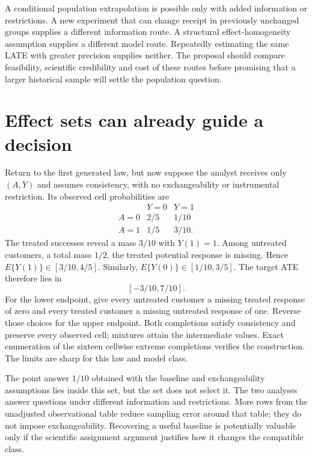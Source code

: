 A conditional population extrapolation is possible only with
added information or restrictions. A new experiment that can
change receipt in previously unchanged groups supplies a
different information route. A structural effect-homogeneity
assumption supplies a different model route. Repeatedly
estimating the same LATE with greater precision supplies
neither. The proposal should compare feasibility, scientific
credibility and cost of these routes before promising that a
larger historical sample will settle the population question.

\section{Effect sets can already guide a decision}
\label{exec17:s3-bounds}

Return to the first generated law, but now suppose the analyst
receives only $(A,Y)$ and assumes consistency, with no
exchangeability or instrumental restriction. Its observed
cell probabilities are
\[
\begin{array}{c|cc}
 &Y=0&Y=1\\ \hline
 A=0&2/5&1/10\\
 A=1&1/5&3/10 .
\end{array}
\]
The treated successes reveal a mass $3/10$ with $Y(1)=1$.
Among untreated customers, a total mass $1/2$, the treated
potential response is missing. Hence
$E\{Y(1)\}\in[3/10,4/5]$. Similarly,
$E\{Y(0)\}\in[1/10,3/5]$.
The target ATE therefore lies in
\[
 [-3/10,7/10].
\]
For the lower endpoint, give every untreated customer a
missing treated response of zero and every treated customer
a missing untreated response of one. Reverse those choices
for the upper endpoint. Both completions satisfy consistency
and preserve every observed cell; mixtures attain the
intermediate values. Exact enumeration of the sixteen
cellwise extreme completions verifies the construction.
The limits are sharp for this law and model
class.\citep{exec17_s3_exact}

The point answer $1/10$ obtained with the baseline and
exchangeability assumptions lies inside this set, but the
set does not select it. The two analyses answer questions
under different information and restrictions. More rows
from the unadjusted observational table reduce sampling
error around that table; they do not impose exchangeability.
Recovering a useful baseline is potentially valuable only
if the scientific assignment argument justifies how it
changes the compatible class.

